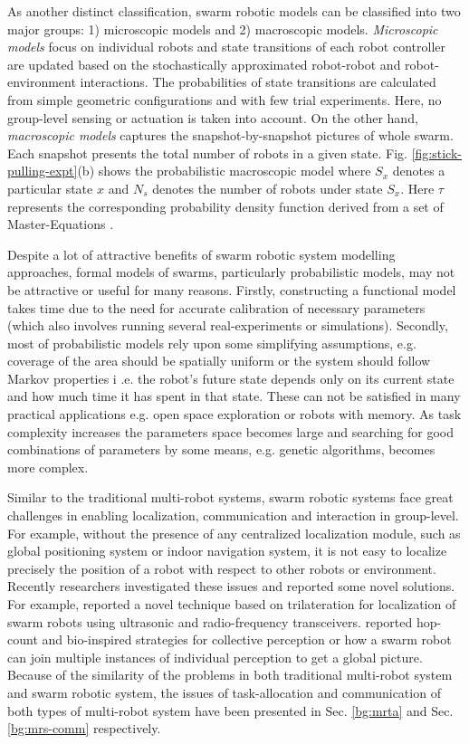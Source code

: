 As another distinct classification, swarm robotic models can be classified into two major groups: 1) microscopic models and 2) macroscopic models. {\em Microscopic models} focus on individual robots and state transitions of each robot controller are updated based on the stochastically approximated robot-robot and robot-environment interactions. The probabilities of state transitions are calculated from simple geometric configurations and with few trial experiments. Here, no group-level sensing or actuation is taken into account. On the other hand, {\em macroscopic models} captures the snapshot-by-snapshot pictures of whole swarm. Each snapshot presents the total number of robots in a given state. Fig. \ref{fig:stick-pulling-expt}(b) shows the probabilistic macroscopic model where $S_{x}$ denotes a particular state $x$ and $N_{s}$ denotes the number of robots under state $S_{x}$. Here $\tau$ represents the corresponding probability density function derived from a set of Master-Equations \cite{Agassounon+2004}.

Despite a lot of attractive benefits of swarm robotic system modelling approaches, formal models of swarms, particularly probabilistic models, may not be attractive or useful for many reasons. Firstly, constructing a functional model takes time due to the need for accurate calibration of necessary parameters (which also involves running several real-experiments or simulations). 
Secondly, most of probabilistic models rely upon some simplifying assumptions, e.g. coverage of the area should be spatially uniform or the system should follow Markov properties i .e. the robot's future state depends only on its current state and how much time it has spent in that state. These can not be satisfied in many practical applications e.g. open space exploration or robots with memory. As task complexity increases the parameters space becomes large and searching for good combinations of parameters by some means, e.g. genetic algorithms, becomes more complex.

Similar to the traditional multi-robot systems, swarm robotic systems face great challenges in enabling localization, communication and  interaction in group-level. For example, without the presence of any centralized localization module, such as global positioning system or indoor navigation system, it is not easy to localize precisely the position of a robot with respect to other robots or environment. Recently researchers investigated  these issues and reported some  novel solutions. For example,  reported a novel technique based on trilateration for localization of swarm robots using ultrasonic and radio-frequency transceivers.  reported hop-count and bio-inspired strategies for collective perception or how a swarm robot can join multiple instances of individual perception to get a global picture. Because of the similarity of the problems in both traditional multi-robot system and swarm robotic system, the issues of  task-allocation and communication of both types of multi-robot system have been presented in Sec. \ref{bg:mrta} and Sec. \ref{bg:mrs-comm} respectively.


